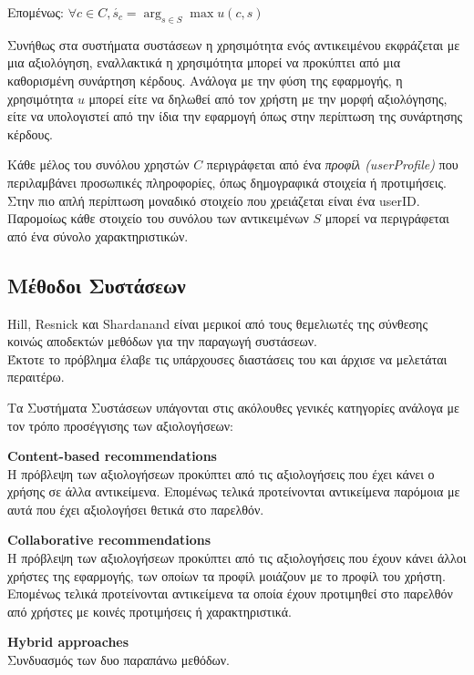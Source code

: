 Επομένως:   $\forall c\in C,  \acute{s_c}=\arg_{s\in S} \max u(c,s) $   

Συνήθως στα συστήματα συστάσεων η χρησιμότητα ενός αντικειμένου εκφράζεται με μια αξιολόγηση, εναλλακτικά η χρησιμότητα μπορεί να προκύπτει από μια καθορισμένη συνάρτηση κέρδους.
Ανάλογα με την φύση της εφαρμογής, η χρησιμότητα $u$ μπορεί είτε να δηλωθεί από τον χρήστη με την μορφή αξιολόγησης,
είτε να υπολογιστεί από την ίδια την εφαρμογή όπως στην περίπτωση της συνάρτησης κέρδους.

Κάθε μέλος του συνόλου χρηστών $C$ περιγράφεται από ένα \emph{προφίλ (userProfile)} που περιλαμβάνει προσωπικές πληροφορίες, όπως δημογραφικά στοιχεία ή προτιμήσεις.
Στην πιο απλή περίπτωση μοναδικό στοιχείο που χρειάζεται είναι ένα userID. 
Παρομοίως κάθε στοιχείο του συνόλου των αντικειμένων $S$ μπορεί να περιγράφεται από ένα σύνολο χαρακτηριστικών. 
\cite{NGRS}

\subsection{Μέθοδοι Συστάσεων}
\noindent
Hill, Resnick και Shardanand είναι μερικοί από τους θεμελιωτές 
της σύνθεσης κοινώς αποδεκτών μεθόδων για την παραγωγή συστάσεων.
\cite{hill1995recommending} \cite{resnick1994grouplens} \cite{shardanand1995social}\\
Έκτοτε το πρόβλημα έλαβε τις υπάρχουσες διαστάσεις του και άρχισε να μελετάται περαιτέρω.
  
Τα Συστήματα Συστάσεων υπάγονται στις ακόλουθες γενικές κατηγορίες ανάλογα με τον τρόπο προσέγγισης των αξιολογήσεων:

\begin{description}
\item \textbf{Content-based recommendations}  \hfill \\
Η πρόβλεψη των αξιολογήσεων προκύπτει από τις αξιολογήσεις που έχει κάνει ο χρήσης σε άλλα αντικείμενα. 
Επομένως τελικά προτείνονται αντικείμενα παρόμοια με αυτά που έχει αξιολογήσει θετικά στο παρελθόν.
\item \textbf{Collaborative recommendations}  \hfill \\
Η πρόβλεψη των αξιολογήσεων προκύπτει από τις αξιολογήσεις που έχουν κάνει άλλοι χρήστες της εφαρμογής, των οποίων τα προφίλ μοιάζουν με το προφίλ του χρήστη. 
Επομένως τελικά προτείνονται αντικείμενα τα οποία έχουν προτιμηθεί στο παρελθόν από χρήστες με κοινές προτιμήσεις ή χαρακτηριστικά.
\item \textbf{Hybrid approaches}  \hfill \\
Συνδυασμός των δυο παραπάνω μεθόδων.
\end{description} 

